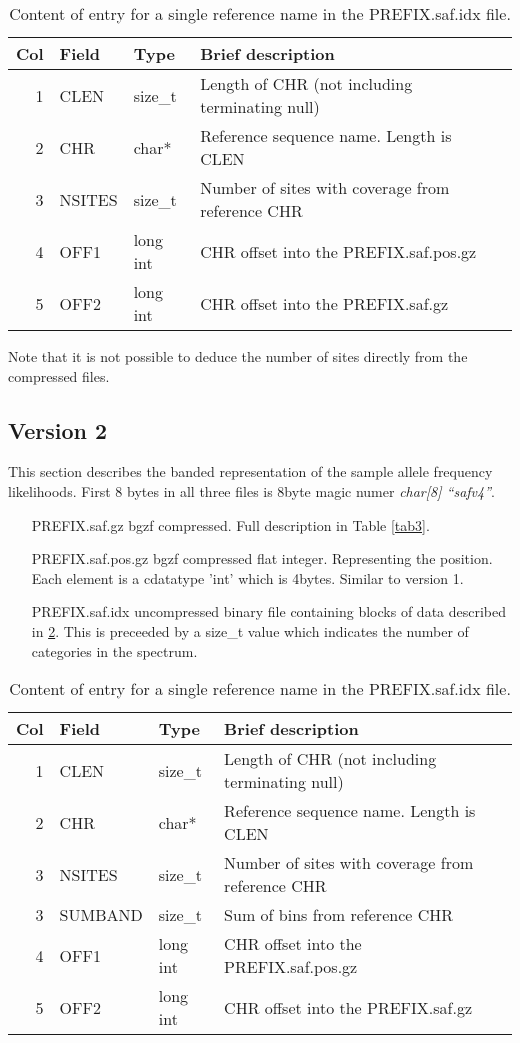 \documentclass[10pt]{article}
\begin{document}
\begin{table}
\begin{tabular}{rllll}
  \hline
  {\bf Col} & {\bf Field} & {\bf Type} & {\bf Brief description} \\
  \hline
  1 & {\sf CLEN} & size\_t &  Length of CHR (not including terminating null)\\
  2 & {\sf CHR} & char* & Reference sequence name. Length is CLEN\\
  3 & {\sf NSITES} & size\_t & Number of sites with coverage from reference CHR\\
  4 & {\sf OFF1} & long int & CHR offset into the PREFIX.saf.pos.gz \\
  5 & {\sf OFF2} & long int & CHR offset into the PREFIX.saf.gz \\
  \hline
\end{tabular}\label{tab1}
\caption{Content of entry for a single reference name in the PREFIX.saf.idx file.}
\end{table}
 Note that it is not possible to deduce the number of sites directly
 from the compressed files.
\clearpage
\subsection{Version 2}
This section describes the banded representation of the sample allele frequency likelihoods.  First 8 bytes in all three files is 8byte magic numer \emph{char[8] ``safv4''}.  
\begin{itemize}
\item[PREFIX.saf.gz] bgzf compressed. Full description in Table \ref{tab3}.
\item[PREFIX.saf.pos.gz] bgzf compressed flat integer. Representing   the position. Each element is a cdatatype 'int' which is  4bytes. Similar to version 1.
\item[PREFIX.saf.idx] uncompressed binary file containing blocks of   data described in \ref{tab4}. This is preceeded by a size\_t value which indicates the number of categories in the spectrum.
\end{itemize}

\begin{table}[h]
\begin{tabular}{rllll}
  \hline
  {\bf Col} & {\bf Field} & {\bf Type} & {\bf Brief description} \\
  \hline
  1 & {\sf CLEN} & size\_t &  Length of CHR (not including terminating null)\\
  2 & {\sf CHR} & char* & Reference sequence name. Length is CLEN\\
  3 & {\sf NSITES} & size\_t & Number of sites with coverage from reference CHR\\
  3 & {\sf SUMBAND} & size\_t & Sum of bins from reference CHR\\
  4 & {\sf OFF1} & long int & CHR offset into the PREFIX.saf.pos.gz \\
  5 & {\sf OFF2} & long int & CHR offset into the PREFIX.saf.gz \\
  \hline
\end{tabular}\label{tab4}
\caption{Content of entry for a single reference name in the PREFIX.saf.idx file.}
\end{table}
\end{document}
